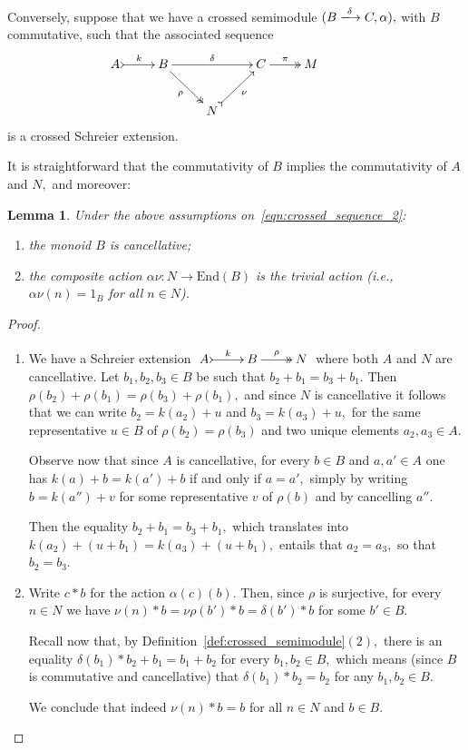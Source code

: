 \documentclass[a4paper]{amsart}
\theoremstyle{plain}
\newtheorem{lemma}[subsection]{Lemma}
\theoremstyle{definition}
\theoremstyle{remark}
\begin{document}
Conversely, suppose that we have a crossed semimodule $(B\xlongrightarrow{\delta}C,\alpha),$ with $B$ commutative, such that the associated sequence
\begin{equation}
\label{eqn:crossed_sequence_2}
\begin{aligned}
\xymatrix{
A \ar@{>->}[r]^-k &B \ar@{->>}[rd]_-{\rho} \ar[rr]^-{\delta} & \ &C \ar@{->>}[r]^-{\pi} &{M} \\
 &\ &N \ar@{>->}[ru]_-{\nu}&\ &\ &\
}
\end{aligned}
\end{equation}
is a crossed Schreier extension.

It is straightforward that the commutativity of $B$ implies the commutativity of $A$ and $N,$ and moreover:
\begin{lemma}
\label{lemma:B_cancellative}
Under the above assumptions on~\eqref{eqn:crossed_sequence_2}:
\begin{enumerate}
\item the monoid $B$ is cancellative;
\item the composite action $\alpha\nu\colon N\rightarrow\mathrm{End}(B)$ is the trivial action (i.e., $\alpha\nu(n)=1_B$ for all $n\in N$).
\end{enumerate}
\end{lemma}
\begin{proof}
\begin{enumerate}
\item We have a Schreier extension $\xymatrix{A \ar@{>->}[r]^-k &B \ar@{->>}[r]^-{\rho} &N}$ where both $A$ and $N$ are cancellative. Let $b_1,b_2,b_3\in B$ be such that $b_2+b_1=b_3+b_1.$ Then $\rho(b_2)+\rho(b_1)=\rho(b_3)+\rho(b_1),$ and since $N$ is cancellative it follows that we can write $b_2=k(a_2)+u$ and $b_3=k(a_3)+u,$ for the same representative $u\in B$ of $\rho(b_2)=\rho(b_3)$ and two unique elements $a_2,a_3\in A.$

Observe now that since $A$ is cancellative, for every $b\in B$ and $a,a'\in A$ one has $k(a)+b=k(a')+b$ if and only if $a=a',$ simply by writing $b=k(a'')+v$ for some representative $v$ of $\rho(b)$ and by cancelling $a''.$

Then the equality $b_2+b_1=b_3+b_1,$ which translates into $k(a_2)+(u+b_1)=k(a_3)+(u+b_1),$ entails that $a_2=a_3,$ so that $b_2=b_3.$
\item Write $c\ast b$ for the action $\alpha(c)(b).$ Then, since $\rho$ is surjective, for every $n\in N$ we have $\nu(n)\ast b=\nu\rho(b')\ast b=\delta(b')\ast b$ for some $b'\in B.$

Recall now that, by Definition~\ref{def:crossed_semimodule}$(2),$ there is an equality $\delta(b_1)\ast b_2+b_1=b_1+b_2$ for every $b_1,b_2\in B,$ which means (since $B$ is commutative and cancellative) that $\delta(b_1)\ast b_2=b_2$ for any $b_1,b_2\in B.$

We conclude that indeed $\nu(n)\ast b=b$ for all $n\in N$ and $b\in B.$
\end{enumerate}
\end{proof}
\end{document}
